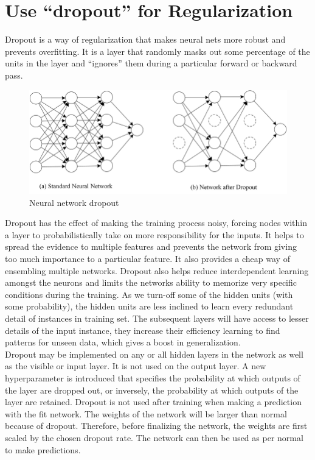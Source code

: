 \section{Use “dropout” for Regularization}
Dropout is a way of regularization that makes neural nets more robust and prevents overfitting. 
It is a layer that randomly masks out some percentage of the units in the layer and “ignores” them during a particular forward or backward pass.\\

\begin{figure}[ht]
\centering
\includegraphics[width=120mm]{lectures/02-b/Dropout.png}
\caption{Neural network dropout}
\label{fig:dropout}
\end{figure}

Dropout has the effect of making the training process noisy, forcing nodes within a layer to probabilistically take on more responsibility for the inputs. 
It helps to spread the evidence to multiple features and prevents the network from giving too much importance to a particular feature. 
It also provides a cheap way of ensembling multiple networks. 
Dropout also helps reduce interdependent learning amongst the neurons and limits the networks ability to memorize very specific conditions during the training. 
As we turn-off some of the hidden units (with some probability), the hidden units are less inclined to learn every redundant detail of instances in training set. 
The subsequent layers will have access to lesser details of the input instance, they increase their efficiency learning to find patterns for unseen data, which gives a boost in generalization.\\

Dropout may be implemented on any or all hidden layers in the network as well as the visible or input layer. It is not used on the output layer. 
A new hyperparameter is introduced that specifies the probability at which outputs of the layer are dropped out, or inversely, the probability at which outputs of the layer are retained. 
Dropout is not used after training when making a prediction with the fit network. 
The weights of the network will be larger than normal because of dropout. 
Therefore, before finalizing the network, the weights are first scaled by the chosen dropout rate. 
The network can then be used as per normal to make predictions.\\

